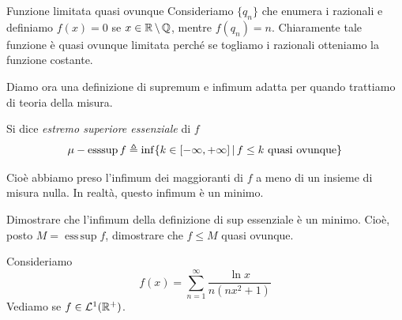 \documentclass[a4paper]{article}
\begin{document}
\begin{radioactive}
\begin{snippetexample}{Funzione limitata quasi ovunque}
    Consideriamo \(\{q_n\}\) che enumera i razionali e definiamo
    \(f(x)=0\) se \(x\in\mathbb{R} \,\backslash\, \mathbb{Q}\),
    mentre \(f(q_n) = n\).
    Chiaramente tale funzione è quasi ovunque limitata
    perché se togliamo i razionali otteniamo la funzione costante.
\end{snippetexample}
\end{radioactive}

\begin{radioactive}
Diamo ora una definizione di supremum e infimum adatta per quando trattiamo di teoria della misura.
\end{radioactive}

\begin{radioactive}
\begin{snippetdefinition}{}
    Si dice \emph{estremo superiore essenziale} di \(f\)
    \[
        \mu-\operatorname{ess sup} f
        \triangleq \inf \{
            k \in [-\infty,+\infty] \,|\, f \leq k \text{ quasi ovunque}
        \}
    \]
\end{snippetdefinition}
\end{radioactive}

\begin{radioactive}
Cioè abbiamo preso l'infimum dei maggioranti di \(f\)
a meno di un insieme di misura nulla.
In realtà, questo infimum è un minimo.
\end{radioactive}
\begin{radioactive}
\begin{snippetexercise}{}
    Dimostrare che l'infimum della definizione di sup essenziale è un minimo.
    Cioè, posto \(M=\operatorname{ess\,sup}f\), dimostrare che
    \(f\leq M\) quasi ovunque.
\end{snippetexercise}
\end{radioactive}

\begin{radioactive}
\begin{snippetexercise}{}
    Consideriamo \[
        f(x) = \sum_{n=1}^\infty \frac{\ln x}{n(nx^2 + 1)}
    \]
    Vediamo se \(f \in \mathcal L^1(\mathbb{R}^+)\).
\end{snippetexercise}
\end{radioactive}
\end{document}
